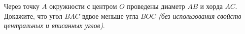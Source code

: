 \begin{ex}
	\begin{condition}
		Через точку \( A  \) окружности с центром \( O  \) проведены диаметр \( AB  \) и хорда \( AC \). Докажите, что угол \( BAC  \) вдвое меньше угла \( BOC \) \textit{(без использования свойств центральных и вписанных углов)}.
	\end{condition}
\end{ex}